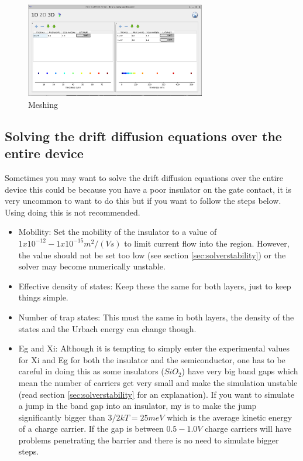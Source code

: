 \begin{figure}[H]
\centering
\includegraphics[width=0.7\textwidth]{./images/ofet/ofet_4.png}
\caption{Meshing}
\label{fig:ofetmeshing}
\end{figure}

\subsection{Solving the drift diffusion equations over the entire device}
Sometimes you may want to solve the drift diffusion equations over the entire device this could be because you have a poor insulator on the gate contact, it is very uncommon to want to do this but if you want to follow the steps below. Using doing this is not recommended.
\begin{itemize}
  \item Mobility: Set the mobility of the insulator to a value of  $1x10^{-12}-1x10^{-15} m^{2}/(Vs)$ to limit current flow into the region. However, the value should not be set too low (see section \ref{sec:solverstability}) or the solver may become numerically unstable.
  \item Effective density of states: Keep these the same for both layers, just to keep things simple.
  \item Number of trap states: This must the same in both layers, the density of the states and the Urbach energy can change though.  
  \item Eg and Xi: Although it is tempting to simply enter the experimental values for Xi and Eg for both the insulator and the semiconductor, one has to be careful in doing this as some insulators ($SiO_2$) have very big band gaps which mean the number of carriers get very small and make the simulation unstable (read section \ref{sec:solverstability} for an explanation).  If you want to simulate a jump in the band gap into an insulator, my is to make the jump significantly bigger than $3/2kT=25meV$ which is the average kinetic energy of a charge carrier.  If the gap is between $0.5-1.0 V$ charge carriers will have problems penetrating the barrier and there is no need to simulate bigger steps.
\end{itemize}







